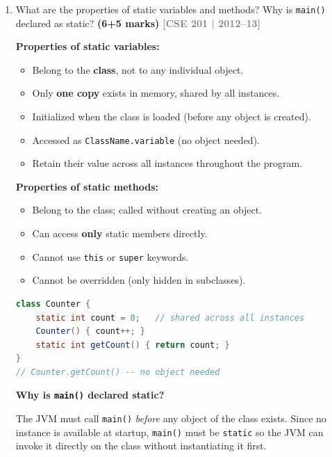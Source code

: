\documentclass[12pt,a3paper]{article}
\newcommand{\yr}[1]{\hfill\textcolor{gray}{\small\textbf{[#1]}}}
\newcommand{\mk}[1]{\textcolor{orange!70!black}{\small\textbf{(#1 marks)}}}
\begin{document}
\begin{enumerate}
\item What are the properties of static variables and methods? Why is \texttt{main()} declared as static? \mk{6+5}
\yr{CSE 201 | 2012--13}

\begin{tcolorbox}[enhanced,breakable,ansbox,
  colback=cC!4,colframe=cC,boxrule=0.8pt,arc=5pt,
  title={\textbf{Answer --- Static Variables, Methods and Why main() is Static}},
  fonttitle=\bfseries\color{white},colbacktitle=cC]

\textbf{Properties of static variables:}
\begin{itemize}[itemsep=2pt]
  \item Belong to the \textbf{class}, not to any individual object.
  \item Only \textbf{one copy} exists in memory, shared by all instances.
  \item Initialized when the class is loaded (before any object is created).
  \item Accessed as \texttt{ClassName.variable} (no object needed).
  \item Retain their value across all instances throughout the program.
\end{itemize}

\textbf{Properties of static methods:}
\begin{itemize}[itemsep=2pt]
  \item Belong to the class; called without creating an object.
  \item Can access \textbf{only} static members directly.
  \item Cannot use \texttt{this} or \texttt{super} keywords.
  \item Cannot be overridden (only hidden in subclasses).
\end{itemize}

\begin{lstlisting}[language=Java]
class Counter {
    static int count = 0;   // shared across all instances
    Counter() { count++; }
    static int getCount() { return count; }
}
// Counter.getCount() -- no object needed
\end{lstlisting}

\textbf{Why is \texttt{main()} declared static?}

The JVM must call \texttt{main()} \emph{before} any object of the class
exists. Since no instance is available at startup, \texttt{main()} must
be \texttt{static} so the JVM can invoke it directly on the class
without instantiating it first.
\end{tcolorbox}


\end{enumerate}
\end{document}
